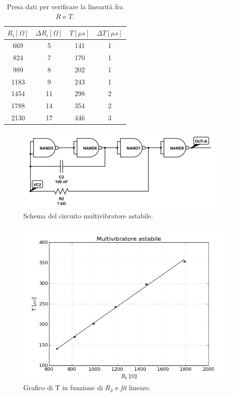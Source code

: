 \documentclass[10pt,a4paper]{article}
\begin{document}

\begin{table}[!htb]
\centering
\begin{tabular}{|c|c|c|c|}
\hline 
$R_i [\Omega]$ & $\Delta R_i [\Omega]$ & $T [\mu s]$ & $\Delta T [\mu s]$\\
\hline
 669 & 5 & 141  & 1\\ 
\hline
 824 &  7 & 170 & 1\\ 
\hline 
 989 &  8 & 202 & 1\\ 
\hline
 1183 &  9 & 243 & 1\\ 
\hline
 1454 &  11 & 298 & 2\\ 
\hline
 1788 & 14 & 354 & 2 \\
\hline
 2130 & 17 & 446 & 3\\
\end{tabular} 
\caption{Presa dati per verificare la linearità fra $R$ e $T$.\label{tab:astabile}}
\end{table}

\begin{figure}[!htb]
  \centering
  \includegraphics[scale=0.5]{astabile.png}
\caption{Schema del circuito multivibratore astabile.\label{fig:astabile}}
\end{figure}

\begin{figure}[!htb]
  \centering
  \includegraphics[scale=0.5]{fitastabile.png}
\caption{Grafico di T in funzione di $R_2$ e \emph{fit} lineare.\label{fit:astabile}}
\end{figure}
\end{document}
